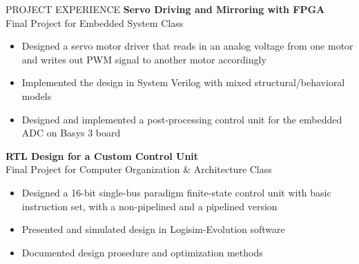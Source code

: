 \documentclass{../lib/resume} %
\begin{document}
	
	\begin{rSection}{PROJECT EXPERIENCE}
		\textbf{Servo Driving and Mirroring with FPGA} \\
		Final Project for Embedded System Class
		\begin{itemize}
			\itemsep -4pt {} 
			\item Designed a servo motor driver that reads in an analog voltage from one motor and writes out PWM signal to another motor accordingly
			\item Implemented the design in System Verilog with mixed structural/behavioral models
			\item Designed and implemented a post-processing control unit for the embedded ADC on Basys 3 board
		\end{itemize}
		
		\textbf{RTL Design for a Custom Control Unit} \\
		Final Project for Computer Organization \& Architecture Class
		\begin{itemize}
			\itemsep -4pt {} 
			\item Designed a 16-bit single-bus paradigm finite-state control unit with basic instruction set, with a non-pipelined and a pipelined version
			\item Presented and simulated design in Logisim-Evolution software
			\item Documented design prosedure and optimization methods
		\end{itemize}
		
		
	\end{rSection} 
	
%		
%		
%	
%		
%		
	
	
\end{document}
